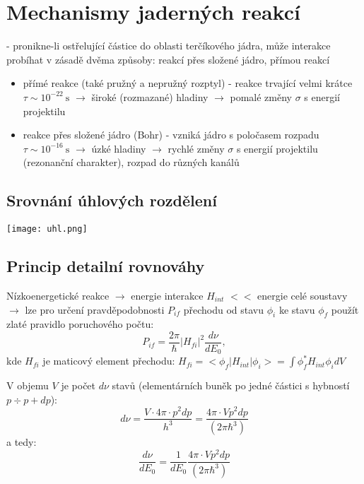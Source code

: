 \documentclass[../../main.tex]{subfiles}
\begin{document}
\section{Mechanismy jaderných reakcí}

- pronikne-li ostřelující částice do oblasti terčíkového jádra, může interakce probíhat v zásadě dvěma způsoby: reakcí přes složené jádro, přímou reakcí
\begin{itemize}
	\item přímé reakce (také pružný a nepružný rozptyl) - reakce trvající velmi krátce $\tau \sim 10^{-22} ~\mathrm{s}$ $\rightarrow$ široké (rozmazané) hladiny $\rightarrow$ pomalé změny $\sigma$ s energií projektilu
	
	\item reakce přes složené jádro (Bohr) - vzniká jádro s poločasem rozpadu $\tau \sim 10^{-16} ~\mathrm{s}$ $\rightarrow$ úzké hladiny $\rightarrow$ rychlé změny $\sigma$ s energií projektilu (rezonanční charakter), rozpad do různých kanálů
\end{itemize}

\subsection{Srovnání úhlových rozdělení}


\begin{center}
	\texttt{[image: uhl.png]}
\end{center}

\subsection{Princip detailní rovnováhy}

Nízkoenergetické reakce $\rightarrow$ energie interakce $H_{int}$ $<<$ energie celé soustavy $\rightarrow$ lze pro určení pravděpodobnosti $P_{if}$ přechodu od stavu $\phi _i$ ke stavu $\phi _f$ použít zlaté pravidlo poruchového počtu:
\begin{equation}
P_{if} = \dfrac{2 \pi}{\hbar} |H_{fi}| ^2 \dfrac{d \nu}{dE_0},
\end{equation}
kde $H_{fi}$ je maticový element přechodu: $H_{fi} = <\phi _f | H_{int} | \phi _i> = \int \phi^{*}_f
H_{int} \phi_i dV$

V objemu $V$ je počet $d \nu$ stavů (elementárních buněk po jedné částici s hybností $p\div p + dp$):
\begin{equation}
d \nu = \dfrac{V \cdotp 4 \pi \cdotp p^2 dp}{h^3} = \dfrac{4\pi \cdotp V p^2 dp}{(2 \pi \hbar ^3)}
\end{equation} 
a tedy:
\begin{equation}
\dfrac{d \nu}{dE_0} = \dfrac{1}{dE_0} \dfrac{4\pi \cdotp V p^2 dp}{(2 \pi \hbar ^3)}
\end{equation}
\end{document}
